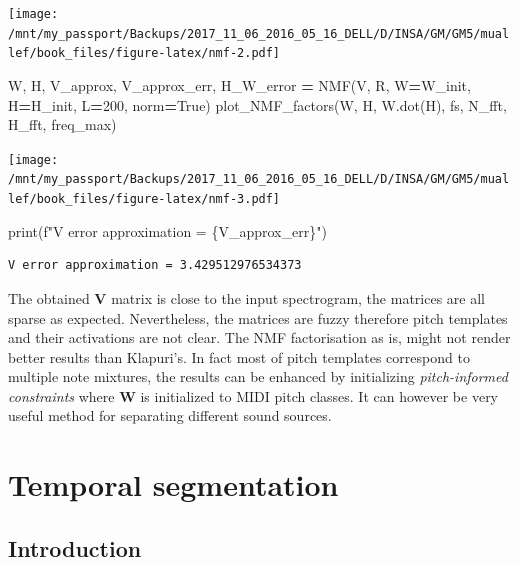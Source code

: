 \documentclass[
  american,
]{article}
\newenvironment{Shaded}{\begin{snugshade}}{\end{snugshade}}
\newcommand{\BuiltInTok}[1]{#1}
\newcommand{\DecValTok}[1]{\textcolor[rgb]{0.00,0.00,0.81}{#1}}
\newcommand{\NormalTok}[1]{#1}
\newcommand{\OperatorTok}[1]{\textcolor[rgb]{0.81,0.36,0.00}{\textbf{#1}}}
\newcommand{\SpecialCharTok}[1]{\textcolor[rgb]{0.00,0.00,0.00}{#1}}
\newcommand{\SpecialStringTok}[1]{\textcolor[rgb]{0.31,0.60,0.02}{#1}}
\newcommand{\VariableTok}[1]{\textcolor[rgb]{0.00,0.00,0.00}{#1}}
\begin{document}
\texttt{[image: /mnt/my\_passport/Backups/2017\_11\_06\_2016\_05\_16\_DELL/D/INSA/GM/GM5/muallef/book\_files/figure-latex/nmf-2.pdf]}

\begin{Shaded}
\begin{Highlighting}[]
\NormalTok{W, H, V\_approx, V\_approx\_err, H\_W\_error }\OperatorTok{=}\NormalTok{ NMF(V, R, W}\OperatorTok{=}\NormalTok{W\_init, H}\OperatorTok{=}\NormalTok{H\_init, L}\OperatorTok{=}\DecValTok{200}\NormalTok{, norm}\OperatorTok{=}\VariableTok{True}\NormalTok{)}
\NormalTok{plot\_NMF\_factors(W, H, W.dot(H), fs, N\_fft, H\_fft, freq\_max)               }
\end{Highlighting}
\end{Shaded}

\texttt{[image: /mnt/my\_passport/Backups/2017\_11\_06\_2016\_05\_16\_DELL/D/INSA/GM/GM5/muallef/book\_files/figure-latex/nmf-3.pdf]}

\begin{Shaded}
\begin{Highlighting}[]
\BuiltInTok{print}\NormalTok{(}\SpecialStringTok{f"V error approximation = }\SpecialCharTok{\{}\NormalTok{V\_approx\_err}\SpecialCharTok{\}}\SpecialStringTok{"}\NormalTok{)}
\end{Highlighting}
\end{Shaded}

\begin{verbatim}
V error approximation = 3.429512976534373
\end{verbatim}

The obtained \(\boldsymbol{V}\) matrix is close to the input spectrogram,
the matrices are all sparse as expected.
Nevertheless, the matrices are fuzzy therefore pitch templates
and their activations are not clear.
The NMF factorisation as is, might not render better results than Klapuri's.
In fact most of pitch templates correspond to multiple note mixtures,
the results can be enhanced by initializing \emph{pitch-informed constraints}
where \(\boldsymbol{W}\) is initialized to MIDI pitch classes.
It can however be very useful method for separating different sound sources.

\pagebreak

\hypertarget{temporal-segmentation}{%
\section{Temporal segmentation}\label{temporal-segmentation}}

\hypertarget{introduction-2}{%
\subsection{Introduction}\label{introduction-2}}
\end{document}
